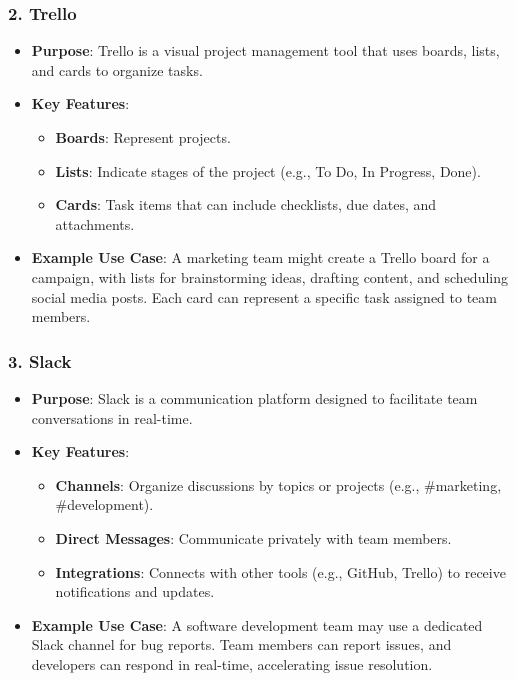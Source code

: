 \documentclass[aspectratio=169]{beamer}
\begin{document}
\begin{frame}[fragile]
    \frametitle{2. Trello}
    \begin{itemize}
        \item \textbf{Purpose}: Trello is a visual project management tool that uses boards, lists, and cards to organize tasks.
        \item \textbf{Key Features}:
        \begin{itemize}
            \item \textbf{Boards}: Represent projects.
            \item \textbf{Lists}: Indicate stages of the project (e.g., To Do, In Progress, Done).
            \item \textbf{Cards}: Task items that can include checklists, due dates, and attachments.
        \end{itemize}
        \item \textbf{Example Use Case}: A marketing team might create a Trello board for a campaign, with lists for brainstorming ideas, drafting content, and scheduling social media posts. Each card can represent a specific task assigned to team members.
    \end{itemize}
\end{frame}

\begin{frame}[fragile]
    \frametitle{3. Slack}
    \begin{itemize}
        \item \textbf{Purpose}: Slack is a communication platform designed to facilitate team conversations in real-time.
        \item \textbf{Key Features}:
        \begin{itemize}
            \item \textbf{Channels}: Organize discussions by topics or projects (e.g., \#marketing, \#development).
            \item \textbf{Direct Messages}: Communicate privately with team members.
            \item \textbf{Integrations}: Connects with other tools (e.g., GitHub, Trello) to receive notifications and updates.
        \end{itemize}
        \item \textbf{Example Use Case}: A software development team may use a dedicated Slack channel for bug reports. Team members can report issues, and developers can respond in real-time, accelerating issue resolution.
    \end{itemize}
\end{frame}
\end{document}
